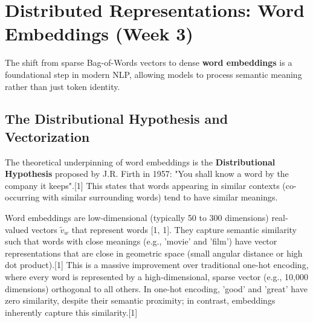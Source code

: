 \documentclass{article}
\begin{document}
\begin{table}[h!]
\centering
\caption{Softmax and Cross-Entropy Loss Synthesis}
\end{table}

\section{Distributed Representations: Word Embeddings (Week 3)}

The shift from sparse Bag-of-Words vectors to dense \textbf{word embeddings} is a foundational step in modern NLP, allowing models to process semantic meaning rather than just token identity.

\subsection{The Distributional Hypothesis and Vectorization}

The theoretical underpinning of word embeddings is the \textbf{Distributional Hypothesis} proposed by J.R. Firth in 1957: "You shall know a word by the company it keeps".[1] This states that words appearing in similar contexts (co-occurring with similar surrounding words) tend to have similar meanings.

Word embeddings are low-dimensional (typically 50 to 300 dimensions) real-valued vectors $\tilde{v}_w$ that represent words [1, 1]. They capture semantic similarity such that words with close meanings (e.g., 'movie' and 'film') have vector representations that are close in geometric space (small angular distance or high dot product).[1] This is a massive improvement over traditional one-hot encoding, where every word is represented by a high-dimensional, sparse vector (e.g., 10,000 dimensions) orthogonal to all others. In one-hot encoding, 'good' and 'great' have zero similarity, despite their semantic proximity; in contrast, embeddings inherently capture this similarity.[1]
\end{document}
